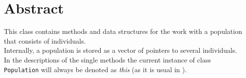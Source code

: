 \section{Abstract}

This class contains methods and data structures for the work
with a population that consists of individuals.\\
Internally, a population is stored as a vector of pointers
to several individuals.\\
In the descriptions of the single methods the current instance
of class\\{\tt Population}
will always be denoted as {\em this} (as it is usual in \cpp).

